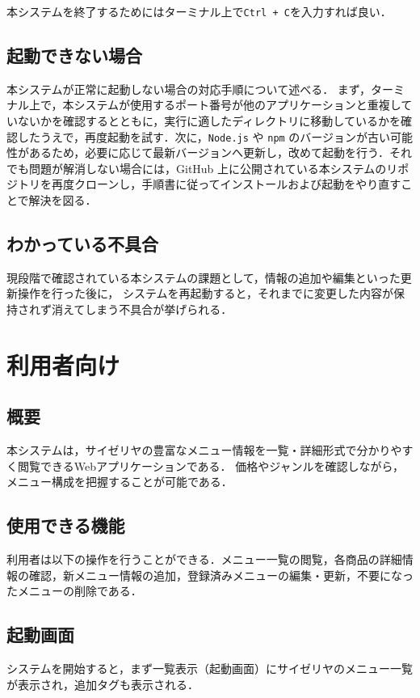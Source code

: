 \documentclass[uplatex,dvipdfmx]{jsarticle}
\begin{document}
本システムを終了するためにはターミナル上で\texttt{Ctrl + C}を入力すれば良い．

\subsection{起動できない場合}
本システムが正常に起動しない場合の対応手順について述べる．
まず，ターミナル上で，本システムが使用するポート番号が他のアプリケーションと重複していないかを確認するとともに，実行に適したディレクトリに移動しているかを確認したうえで，再度起動を試す．次に，\texttt{Node.js} や \texttt{npm} のバージョンが古い可能性があるため，必要に応じて最新バージョンへ更新し，改めて起動を行う．それでも問題が解消しない場合には，GitHub 上に公開されている本システムのリポジトリを再度クローンし，手順書に従ってインストールおよび起動をやり直すことで解決を図る．

\subsection{わかっている不具合}

現段階で確認されている本システムの課題として，情報の追加や編集といった更新操作を行った後に，
システムを再起動すると，それまでに変更した内容が保持されず消えてしまう不具合が挙げられる．

\section{利用者向け}

\subsection{概要}
本システムは，サイゼリヤの豊富なメニュー情報を一覧・詳細形式で分かりやすく閲覧できるWebアプリケーションである．
価格やジャンルを確認しながら，メニュー構成を把握することが可能である．

\subsection{使用できる機能}
利用者は以下の操作を行うことができる．メニュー一覧の閲覧，各商品の詳細情報の確認，新メニュー情報の追加，登録済みメニューの編集・更新，不要になったメニューの削除である．

\subsection{起動画面}
システムを開始すると，まず一覧表示（起動画面）にサイゼリヤのメニュー一覧が表示され，追加タグも表示される．
\end{document}
